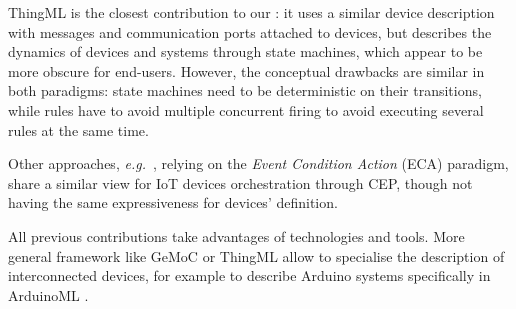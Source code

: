 ThingML \cite{Harrand-Fleurey-Morin-Husa:2016} is the closest contribution to our \DSL: it uses a similar device description with messages and communication ports attached to devices, but describes the dynamics of devices and systems through state machines, which appear to be more obscure for end-users. However, the conceptual drawbacks are similar in both paradigms: state machines need to be deterministic on their transitions, while rules have to avoid multiple concurrent firing to avoid executing several rules at the same time. 

Other approaches, \textit{e.g.}~\cite{cheng-16,bhandari-13}, relying on the \textit{Event Condition Action} (ECA) paradigm, share a similar view for IoT devices orchestration through CEP, though not having the same expressiveness for devices' definition.

All previous contributions take advantages of \MDE technologies and tools. More general \MDE framework like GeMoC \cite{Bousse-Degueule-Vojtisek-etAl:2016} or ThingML allow to specialise the description of interconnected devices, for example to describe Arduino systems specifically in ArduinoML \cite{Mosser-Collet-BlayFornarino:2014}.